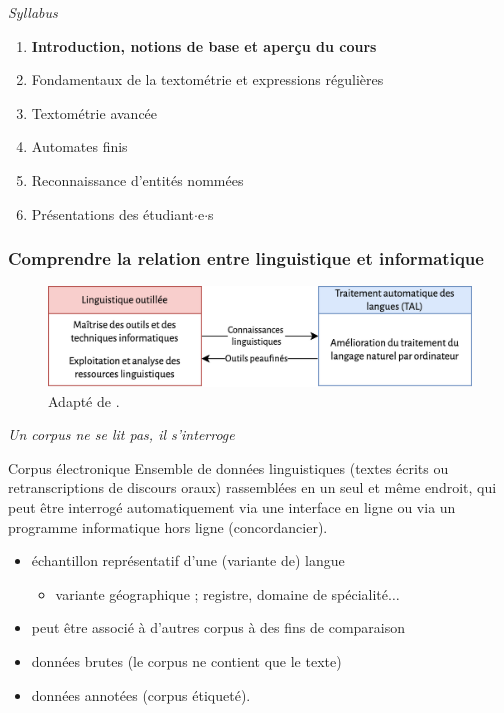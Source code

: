 \documentclass[xetex,xcolor={table,usenames,dvipsnames}]{beamer}
\newcommand{\bolder}[1]{{\color{purple}\bfseries#1}}
\begin{document}
\begin{frame}{\textit{Syllabus}}
	\begin{enumerate}
		\item \bolder{Introduction, notions de base et aperçu du cours}
		\item Fondamentaux de la textométrie et expressions régulières
		\item Textométrie avancée
		\item Automates finis
		\item Reconnaissance d'entités nommées
		\item Présentations des étudiant$\cdot$e$\cdot$s
	\end{enumerate}
\end{frame}

\begin{frame}
    \frametitle{Comprendre la relation entre linguistique et informatique}

\begin{figure}[h] %
	\centering
	\includegraphics[width=\linewidth]{img/linguistique_outillee_TAL.png}
	\caption{Adapté de \textcite{hodac}.}
	\label{fig:ling_out_TAL}
\end{figure}


\end{frame}



\begin{frame}{\og{}\textit{Un corpus ne se lit pas, il s'interroge}\fg{}}
	\begin{block}{Corpus électronique}
		\justifying
		Ensemble de données linguistiques (textes écrits ou retranscriptions de discours oraux) rassemblées en un seul et même endroit, qui peut être interrogé automatiquement via une interface en ligne ou via un programme informatique hors ligne (concordancier).


	\end{block}
		\begin{itemize}
		\item échantillon représentatif d’une (variante de) langue
		\begin{itemize}
			\item  variante géographique ; registre, domaine de spécialité$\dots$
		\end{itemize}
		\item peut être associé à d’autres corpus à des fins de comparaison
		\item données brutes (le corpus ne contient que le texte) 
		\item données annotées (corpus étiqueté). 
	\end{itemize}
\begin{flushright}
\citep{loock2017web}
\end{flushright}
\end{frame}
\end{document}
